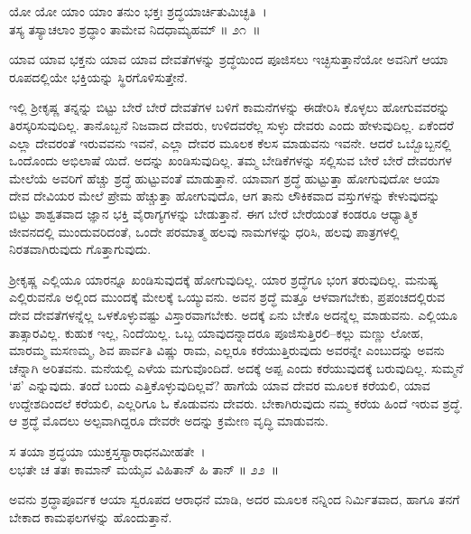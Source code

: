 \begin{shloka}
ಯೋ ಯೋ ಯಾಂ ಯಾಂ ತನುಂ ಭಕ್ತಃ ಶ್ರದ್ಧಯಾರ್ಚಿತುಮಿಚ್ಛತಿ~।\\ತಸ್ಯ ತಸ್ಯಾಚಲಾಂ ಶ್ರದ್ಧಾಂ ತಾಮೇವ ನಿದಧಾಮ್ಯಹಮ್ \hfill॥ ೨೧~॥
\end{shloka}

\begin{artha}
ಯಾವ ಯಾವ ಭಕ್ತನು ಯಾವ ಯಾವ ದೇವತೆಗಳನ್ನು ಶ್ರದ್ಧೆಯಿಂದ ಪೂಜಿಸಲು ಇಚ್ಛಿಸುತ್ತಾನೆಯೋ ಅವನಿಗೆ ಆಯಾ ರೂಪದಲ್ಲಿಯೇ ಭಕ್ತಿಯನ್ನು ಸ್ಥಿರಗೊಳಿಸುತ್ತೇನೆ.
\end{artha}

ಇಲ್ಲಿ ಶ‍್ರೀಕೃಷ್ಣ ತನ್ನನ್ನು ಬಿಟ್ಟು ಬೇರೆ ಬೇರೆ ದೇವತೆಗಳ ಬಳಿಗೆ ಕಾಮನೆಗಳನ್ನು ಈಡೇರಿಸಿ ಕೊಳ್ಳಲು ಹೋಗುವವರನ್ನು ತಿರಸ್ಕರಿಸುವುದಿಲ್ಲ. ತಾನೊಬ್ಬನೆ ನಿಜವಾದ ದೇವರು, ಉಳಿದವರೆಲ್ಲ ಸುಳ್ಳು ದೇವರು ಎಂದು ಹೇಳುವುದಿಲ್ಲ. ಏಕೆಂದರೆ ಎಲ್ಲಾ ದೇವರಂತೆ ಇರುವವನು ಇವನೆ, ಎಲ್ಲಾ ದೇವರ ಮೂಲಕ ಕೆಲಸ ಮಾಡುವನು ಇವನೇ. ಆದರೆ ಒಬ್ಬೊಬ್ಬನಲ್ಲಿ ಒಂದೊಂದು ಅಭಿಲಾಷೆ ಯಿದೆ. ಅದನ್ನು ಖಂಡಿಸುವುದಿಲ್ಲ. ತಮ್ಮ ಬೇಡಿಕೆಗಳನ್ನು ಸಲ್ಲಿಸುವ ಬೇರೆ ಬೇರೆ ದೇವರುಗಳ ಮೇಲೆಯೆ ಅವರಿಗೆ ಹೆಚ್ಚು ಶ್ರದ್ಧೆ ಹುಟ್ಟುವಂತೆ ಮಾಡುತ್ತಾನೆ. ಯಾವಾಗ ಶ್ರದ್ಧೆ ಹುಟ್ಟುತ್ತಾ ಹೋಗುವುದೋ ಆಯಾ ದೇವ ದೇವಿಯರ ಮೇಲೆ ಪ್ರೇಮ ಹೆಚ್ಚುತ್ತಾ ಹೋಗುವುದೊ, ಆಗ ತಾನು ಲೌಕಿಕವಾದ ವಸ್ತುಗಳನ್ನು ಕೇಳುವುದನ್ನು ಬಿಟ್ಟು ಶಾಶ್ವತವಾದ ಜ್ಞಾನ ಭಕ್ತಿ ವೈರಾಗ್ಯಗಳನ್ನು ಬೇಡುತ್ತಾನೆ. ಈಗ ಬೇರೆ ಬೇರೆಯಂತೆ ಕಂಡರೂ ಆಧ್ಯಾತ್ಮಿಕ ಜೀವನದಲ್ಲಿ ಮುಂದುವರಿದಂತೆ, ಒಂದೇ ಪರಮಾತ್ಮ ಹಲವು ನಾಮಗಳನ್ನು ಧರಿಸಿ, ಹಲವು ಪಾತ್ರಗಳಲ್ಲಿ ನಿರತವಾಗಿರುವುದು ಗೊತ್ತಾಗುವುದು.

ಶ‍್ರೀಕೃಷ್ಣ ಎಲ್ಲಿಯೂ ಯಾರನ್ನೂ ಖಂಡಿಸುವುದಕ್ಕೆ ಹೋಗುವುದಿಲ್ಲ. ಯಾರ ಶ್ರದ್ಧೆಗೂ ಭಂಗ ತರುವುದಿಲ್ಲ. ಮನುಷ್ಯ ಎಲ್ಲಿರುವನೊ ಅಲ್ಲಿಂದ ಮುಂದಕ್ಕೆ ಮೇಲಕ್ಕೆ ಒಯ್ಯುವನು. ಅವನ ಶ್ರದ್ಧೆ ಮತ್ತೂ ಆಳವಾಗಬೇಕು, ಪ್ರಪಂಚದಲ್ಲಿರುವ ದೇವ ದೇವತೆಗಳನ್ನೆಲ್ಲ ಒಳಕೊಳ್ಳುವಷ್ಟು ವಿಸ್ತಾರವಾಗಬೇಕು. ಅದಕ್ಕೆ ಏನು ಬೇಕೊ ಅದನ್ನೆಲ್ಲ ಮಾಡುವನು. ಎಲ್ಲಿಯೂ ತಾತ್ಸಾರವಿಲ್ಲ. ಕುಹುಕ ಇಲ್ಲ, ನಿಂದೆಯಿಲ್ಲ. ಒಬ್ಬ ಯಾವುದನ್ನಾದರೂ ಪೂಜಿಸುತ್ತಿರಲಿ–ಕಲ್ಲು ಮಣ್ಣು ಲೋಹ, ಮಾರಮ್ಮ ಮಸಣಮ್ಮ, ಶಿವ ಪಾರ್ವತಿ ವಿಷ್ಣು ರಾಮ, ಎಲ್ಲರೂ ಕರೆಯುತ್ತಿರುವುದು ಅವರನ್ನೇ ಎಂಬುದನ್ನು ಅವನು ಚೆನ್ನಾಗಿ ಅರಿತವನು. ಮನೆಯಲ್ಲಿ ಎಳೆಯ ಮಗುವೊಂದಿದೆ. ಅದಕ್ಕೆ ಅಪ್ಪ ಎಂದು ಕರೆಯುವುದಕ್ಕೆ ಬರುವುದಿಲ್ಲ. ಸುಮ್ಮನೆ ‘ಪ’ ಎನ್ನುವುದು. ತಂದೆ ಬಂದು ಎತ್ತಿಕೊಳ್ಳುವುದಿಲ್ಲವೆ? ಹಾಗೆಯೆ ಯಾವ ದೇವರ ಮೂಲಕ ಕರೆಯಲಿ, ಯಾವ ಉದ್ದೇಶದಿಂದಲೆ ಕರೆಯಲಿ, ಎಲ್ಲರಿಗೂ ಓ ಕೊಡುವನು ದೇವರು. ಬೇಕಾಗಿರುವುದು ನಮ್ಮ ಕರೆಯ ಹಿಂದೆ ಇರುವ ಶ್ರದ್ಧೆ. ಆ ಶ್ರದ್ಧೆ ಮೊದಲು ಅಲ್ಪವಾಗಿದ್ದರೂ ದೇವರೇ ಅದನ್ನು ಕ್ರಮೇಣ ವೃದ್ಧಿ ಮಾಡುವನು.

\begin{shloka}
ಸ ತಯಾ ಶ್ರದ್ಧಯಾ ಯುಕ್ತಸ್ತಸ್ಯಾರಾಧನಮೀಹತೇ~।\\ಲಭತೇ ಚ ತತಃ ಕಾಮಾನ್ ಮಯೈವ ವಿಹಿತಾನ್ ಹಿ ತಾನ್ \hfill॥ ೨೨~॥ 
\end{shloka}

\begin{artha}
ಅವನು ಶ್ರದ್ಧಾಪೂರ್ವಕ ಆಯಾ ಸ್ವರೂಪದ ಆರಾಧನೆ ಮಾಡಿ, ಅದರ ಮೂಲಕ ನನ್ನಿಂದ ನಿರ್ಮಿತವಾದ, ಹಾಗೂ ತನಗೆ ಬೇಕಾದ ಕಾಮಫಲಗಳನ್ನು ಹೊಂದುತ್ತಾನೆ.
\end{artha}

